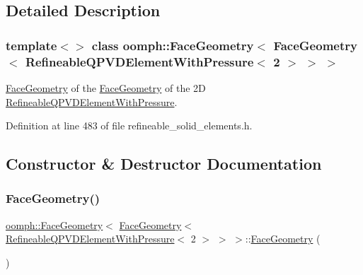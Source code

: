 \subsection{Detailed Description}
\subsubsection*{template$<$$>$\newline
class oomph\+::\+Face\+Geometry$<$ Face\+Geometry$<$ Refineable\+Q\+P\+V\+D\+Element\+With\+Pressure$<$ 2 $>$ $>$ $>$}

\hyperlink{classoomph_1_1FaceGeometry}{Face\+Geometry} of the \hyperlink{classoomph_1_1FaceGeometry}{Face\+Geometry} of the 2D \hyperlink{classoomph_1_1RefineableQPVDElementWithPressure}{Refineable\+Q\+P\+V\+D\+Element\+With\+Pressure}. 

Definition at line 483 of file refineable\+\_\+solid\+\_\+elements.\+h.



\subsection{Constructor \& Destructor Documentation}
\mbox{\label{classoomph_1_1FaceGeometry_3_01FaceGeometry_3_01RefineableQPVDElementWithPressure_3_012_01_4_01_4_01_4_af733346020801853c25bd0a8c4465736}} 
\subsubsection{\texorpdfstring{Face\+Geometry()}{FaceGeometry()}}
{\footnotesize\ttfamily \hyperlink{classoomph_1_1FaceGeometry}{oomph\+::\+Face\+Geometry}$<$ \hyperlink{classoomph_1_1FaceGeometry}{Face\+Geometry}$<$ \hyperlink{classoomph_1_1RefineableQPVDElementWithPressure}{Refineable\+Q\+P\+V\+D\+Element\+With\+Pressure}$<$ 2 $>$ $>$ $>$\+::\hyperlink{classoomph_1_1FaceGeometry}{Face\+Geometry} (\begin{DoxyParamCaption}{ }\end{DoxyParamCaption})\hspace{0.3cm}{\ttfamily [inline]}}



